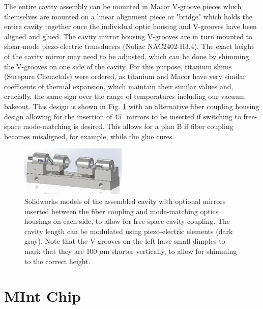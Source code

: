 The entire cavity assembly can be mounted in Macor V-groove pieces which themselves are mounted on a linear alignment piece or "bridge" which holds the entire cavity together once the individual optic housing and V-grooves have been aligned and glued. The cavity mirror housing V-grooves are in turn mounted to shear-mode piezo-electric transducers (Noliac NAC2402-H3.4). The exact height of the cavity mirror may need to be adjusted, which can be done by shimming the V-grooves on one side of the cavity. For this purpose, titanium shims (Surepure Chemetals) were ordered, as titanium and Macor have very similar coefficents of thermal expansion, which maintain their similar values and, crucially, the same sign over the range of temperatures including our vacuum bakeout. This design is shown in Fig. \ref{fig:cavitybridge} with an alternative fiber coupling housing design allowing for the insertion of $45^{\circ}$ mirrors to be inserted if switching to free-space mode-matching is desired. This allows for a plan B if fiber coupling becomes misaligned, for example, while the glue cures.
\begin{figure}[!ht]
    \centering
    \includegraphics[width=0.45\textwidth]{Images/cavitybridge.pdf}
    \caption{Solidworks models of the assembled cavity with optional mirrors inserted between the fiber coupling and mode-matching optics housings on each side, to allow for free-space cavity coupling. The cavity length can be modulated using piezo-electric elements (dark gray). Note that the V-grooves on the left have small dimples to mark that they are 100 $\mu$m shorter vertically, to allow for shimming to the correct height.}
    \label{fig:cavitybridge}
\end{figure}

\section{MInt Chip}\label{sec:mintchip}

